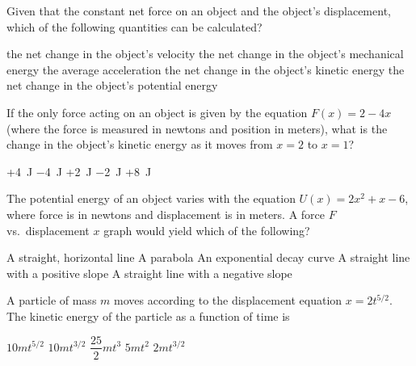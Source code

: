 \documentclass{../../../oss-classkick-exam}
\begin{document}
\begin{multicols*}{2}
\begin{questions}
    \question Given that the constant net force on an object and the object's 
    displacement, which of the following quantities can be calculated?
    \begin{choices}
      \choice the net change in the object's velocity
      \choice the net change in the object's mechanical energy
      \choice the average acceleration
      \choice the net change in the object's kinetic energy
      \choice the net change in the object's potential energy
    \end{choices}
    \vspace{.7in}
    
    
    \question If the only force acting on an object is given by the equation
    $F(x)=2-4x$ (where the force is measured in newtons and position in meters),
    what is the change in the object's kinetic energy as it moves from $x=2$ to
    $x=1$?
    \begin{choices}
      \choice +\SI{4}{\joule}
      \choice \SI{-4}{\joule}
      \choice +\SI{2}{\joule}
      \choice \SI{-2}{\joule}
      \choice +\SI{8}{\joule}
    \end{choices}
    
    \question The potential energy of an object varies with the equation
    $U(x)=2x^2+x-6$, where force is in newtons and displacement is in meters. A
    force $F$ vs.\ displacement $x$ graph would yield which of the following?
    \begin{choices}
      \choice A straight, horizontal line
      \choice A parabola
      \choice An exponential decay curve
      \choice A straight line with a positive slope
      \choice A straight line with a negative slope
    \end{choices}
    \vspace{.7in}
    
    \question A particle of mass $m$ moves according to the displacement
    equation $x=2t^{5/2}$. The kinetic energy of the particle as a function of
    time is
    \begin{choices}
      \choice $10mt^{5/2}$
      \choice $10mt^{3/2}$
      \choice $\dfrac{25}2mt^3$
      \choice $5mt^2$
      \choice $2mt^{3/2}$
    \end{choices}


\end{questions}
\end{multicols*}
\end{document}
